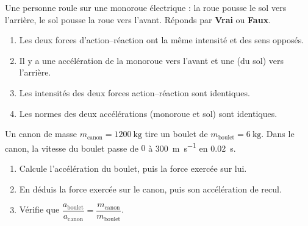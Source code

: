 \documentclass[11pt,a4paper]{article}
\begin{document}
\begin{exo}
Une personne roule sur une monoroue électrique : la roue pousse le sol vers l'arrière, le sol pousse la
roue vers l'avant. Réponds par \textbf{Vrai} ou \textbf{Faux}.
\begin{enumerate}[label=\Alph*.]
  \item Les deux forces d'action--réaction ont la même intensité et des sens opposés.
  \item Il y a une accélération de la monoroue vers l'avant et une (du sol) vers l'arrière.
  \item Les intensités des deux forces action--réaction sont identiques.
  \item Les normes des deux accélérations (monoroue et sol) sont identiques.
\end{enumerate}
\end{exo}

\begin{exo}
Un canon de masse $m_{\text{canon}}=\qty{1200}{\kilogram}$ tire un boulet de $m_{\text{boulet}}=\qty{6}{\kilogram}$.
Dans le canon, la vitesse du boulet passe de $0$ à \qty{300}{\metre\per\second} en \qty{0,02}{\second}.
\begin{enumerate}[label=\alph*)]
  \item Calcule l'accélération du boulet, puis la force exercée sur lui.
  \item En déduis la force exercée sur le canon, puis son accélération de recul.
  \item Vérifie que $\dfrac{a_{\text{boulet}}}{a_{\text{canon}}}=\dfrac{m_{\text{canon}}}{m_{\text{boulet}}}$.
\end{enumerate}
\end{exo}
\end{document}
